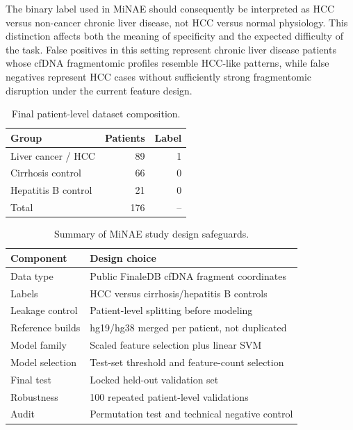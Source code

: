 \documentclass[conference]{IEEEtran}
\begin{document}
The binary label used in MiNAE should consequently be interpreted as HCC versus non-cancer chronic liver disease, not HCC versus normal physiology. This distinction affects both the meaning of specificity and the expected difficulty of the task. False positives in this setting represent chronic liver disease patients whose cfDNA fragmentomic profiles resemble HCC-like patterns, while false negatives represent HCC cases without sufficiently strong fragmentomic disruption under the current feature design.

\begin{table}[t]
\centering
\caption{Final patient-level dataset composition.}
\label{tab:dataset}
\begin{tabular}{lrr}
\toprule
Group & Patients & Label \\
\midrule
Liver cancer / HCC & 89 & 1 \\
Cirrhosis control & 66 & 0 \\
Hepatitis B control & 21 & 0 \\
\midrule
Total & 176 & -- \\
\bottomrule
\end{tabular}
\end{table}

\begin{table}[t]
\centering
\caption{Summary of MiNAE study design safeguards.}
\label{tab:design}
\begin{tabular}{p{}p{}}
\toprule
Component & Design choice \\
\midrule
Data type & Public FinaleDB cfDNA fragment coordinates \\
Labels & HCC versus cirrhosis/hepatitis B controls \\
Leakage control & Patient-level splitting before modeling \\
Reference builds & hg19/hg38 merged per patient, not duplicated \\
Model family & Scaled feature selection plus linear SVM \\
Model selection & Test-set threshold and feature-count selection \\
Final test & Locked held-out validation set \\
Robustness & 100 repeated patient-level validations \\
Audit & Permutation test and technical negative control \\
\bottomrule
\end{tabular}
\end{table}
\end{document}

